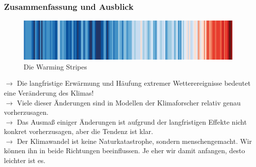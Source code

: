 \begin{frame}
	\frametitle{Zusammenfassung und Ausblick}
	\begin{figure}
		\centering
		\includegraphics[width=\linewidth]{bilder/s4f-warming-stripes}
		\caption{Die Warming Stripes}
	\end{figure}
	$\rightarrow$ Die langfristige Erwärmung und Häufung extremer Wetterereignisse bedeutet eine Veränderung des Klimas!\\
	$\rightarrow$ Viele dieser Änderungen sind in Modellen der Klimaforscher relativ genau vorherzusagen. \\
	$\rightarrow$ Das Ausmaß einiger Änderungen ist aufgrund der langfristigen Effekte nicht konkret vorherzusagen, aber die Tendenz ist klar. \\
	$\rightarrow$ Der Klimawandel ist keine Naturkatastrophe, sondern menschengemacht. Wir können ihn in beide Richtungen beeinflussen. Je eher wir damit anfangen, desto leichter ist es.
\end{frame}
